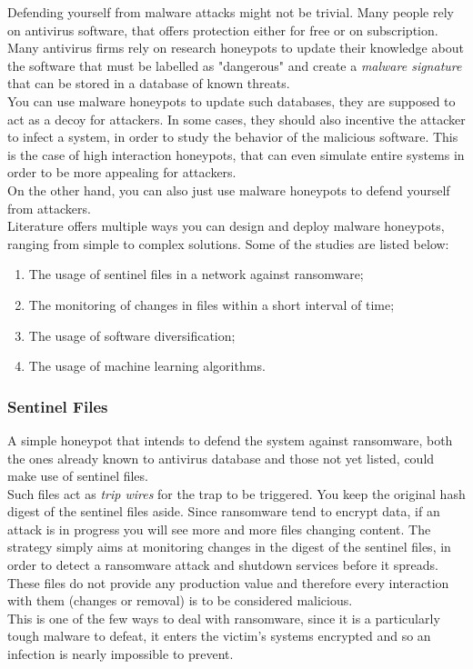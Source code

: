 Defending yourself from malware attacks might not be trivial. Many people rely on antivirus software, that offers protection either for free or on subscription.\\
Many antivirus firms rely on research honeypots to update their knowledge about the software that must be labelled as "dangerous" and create a \textit{malware signature} that can be stored in a database of known threats.\\
You can use malware honeypots to update such databases, they are supposed to act as a decoy for attackers. In some cases, they should also incentive the attacker to infect a system, in order to study the behavior of the malicious software. This is the case of high interaction honeypots, that can even simulate entire systems in order to be more appealing for attackers.\\
On the other hand, you can also just use malware honeypots to defend yourself from attackers.\\
Literature offers multiple ways you can design and deploy malware honeypots, ranging from simple to complex solutions. Some of the studies are listed below:
\begin{enumerate}
    \item The usage of sentinel files in a network against ransomware;
    \item The monitoring of changes in files within a short interval of time;
    \item The usage of software diversification;
    \item The usage of machine learning algorithms.
\end{enumerate}

\subsubsection{Sentinel Files}
A simple honeypot that intends to defend the system against ransomware, both the ones already known to antivirus database and those not yet listed, could make use of sentinel files.\\
Such files act as \textit{trip wires} for the trap to be triggered. You keep the original hash digest of the sentinel files aside. Since ransomware tend to encrypt data, if an attack is in progress you will see more and more files changing content.
The strategy simply aims at monitoring changes in the digest of the sentinel files, in order to detect a ransomware attack and shutdown services before it spreads.\\
These files do not provide any production value and therefore every interaction with them (changes or removal) is to be considered malicious.\\
This is one of the few ways to deal with ransomware, since it is a particularly tough malware to defeat, it enters the victim's systems encrypted and so an infection is nearly impossible to prevent.


